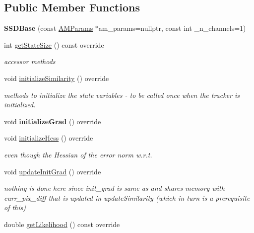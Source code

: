 \subsection*{Public Member Functions}
\begin{DoxyCompactItemize}
\item 
\hypertarget{classSSDBase_a6f2cfb9f47122eb73d37742c1c970239}{{\bfseries S\-S\-D\-Base} (const \hyperlink{structAMParams}{A\-M\-Params} $\ast$am\-\_\-params=nullptr, const int \-\_\-n\-\_\-channels=1)}\label{classSSDBase_a6f2cfb9f47122eb73d37742c1c970239}

\item 
\hypertarget{classSSDBase_a898d66aeb9369032eeb9f14dcb4895a3}{int \hyperlink{classSSDBase_a898d66aeb9369032eeb9f14dcb4895a3}{get\-State\-Size} () const override}\label{classSSDBase_a898d66aeb9369032eeb9f14dcb4895a3}

\begin{DoxyCompactList}\small\item\em accessor methods \end{DoxyCompactList}\item 
void \hyperlink{classSSDBase_a4acb936a3a965b32b9efad72d60ec6dd}{initialize\-Similarity} () override
\begin{DoxyCompactList}\small\item\em methods to initialize the state variables -\/ to be called once when the tracker is initialized. \end{DoxyCompactList}\item 
\hypertarget{classSSDBase_a7bd4ee58f5cf8835c7100cd52c4fc51f}{void {\bfseries initialize\-Grad} () override}\label{classSSDBase_a7bd4ee58f5cf8835c7100cd52c4fc51f}

\item 
void \hyperlink{classSSDBase_a603f5419f5e2c988d6dfffcda3ab579f}{initialize\-Hess} () override
\begin{DoxyCompactList}\small\item\em even though the Hessian of the error norm w.\-r.\-t. \end{DoxyCompactList}\item 
\hypertarget{classSSDBase_a6b29ec06265310926dbe18ada3d55499}{void \hyperlink{classSSDBase_a6b29ec06265310926dbe18ada3d55499}{update\-Init\-Grad} () override}\label{classSSDBase_a6b29ec06265310926dbe18ada3d55499}

\begin{DoxyCompactList}\small\item\em nothing is done here since init\-\_\-grad is same as and shares memory with curr\-\_\-pix\-\_\-diff that is updated in update\-Similarity (which in turn is a prerequisite of this) \end{DoxyCompactList}\item 
\hypertarget{classSSDBase_a35bbf20c67bce84f7f84b67a373b5dab}{double \hyperlink{classSSDBase_a35bbf20c67bce84f7f84b67a373b5dab}{get\-Likelihood} () const override}\label{classSSDBase_a35bbf20c67bce84f7f84b67a373b5dab}


\end{DoxyCompactItemize}
